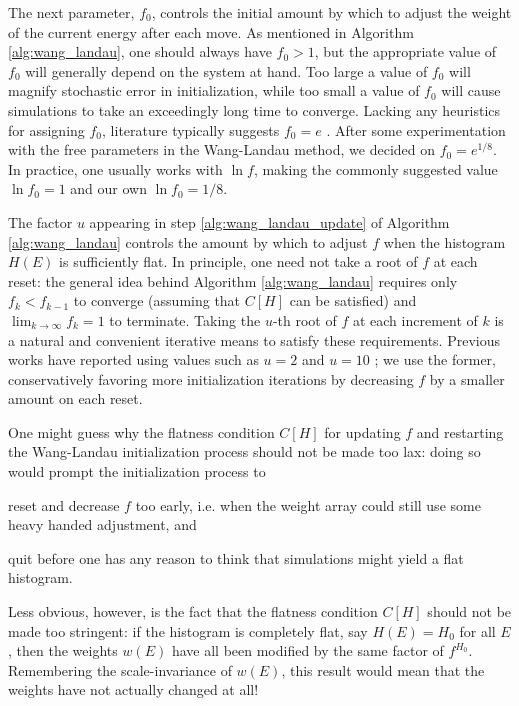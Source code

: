 \documentclass[11pt]{article}
\newcommand{\p}[1]{\left(#1\right)} %
\renewcommand{\sp}[1]{\left[#1\right]} %
\begin{document}
The next parameter, $f_0$, controls the initial amount by which to
adjust the weight of the current energy after each move. As mentioned
in Algorithm \ref{alg:wang_landau}, one should always have $f_0>1$,
but the appropriate value of $f_0$ will generally depend on the system
at hand. Too large a value of $f_0$ will magnify stochastic error in
initialization, while too small a value of $f_0$ will cause
simulations to take an exceedingly long time to converge. Lacking any
heuristics for assigning $f_0$, literature typically suggests $f_0=e$
\cite{wang_landau}. After some experimentation with the free
parameters in the Wang-Landau method, we decided on $f_0=e^{1/8}$. In
practice, one usually works with $\ln f$, making the commonly
suggested value $\ln f_0=1$ and our own $\ln f_0=1/8$.

The factor $u$ appearing in step \ref{alg:wang_landau_update} of
Algorithm \ref{alg:wang_landau} controls the amount by which to adjust
$f$ when the histogram $H\p{E}$ is sufficiently flat. In principle,
one need not take a root of $f$ at each reset: the general idea behind
Algorithm \ref{alg:wang_landau} requires only $f_k<f_{k-1}$ to
converge (assuming that $C\sp{H}$ can be satisfied) and
$\lim_{k\to\infty}f_k=1$ to terminate. Taking the $u$-th root of $f$
at each increment of $k$ is a natural and convenient iterative means
to satisfy these requirements. Previous works have reported using
values such as $u=2$ \cite{wang_landau, wang_landau_mod} and $u=10$
\cite{wang_landau_analysis}; we use the former, conservatively
favoring more initialization iterations by decreasing $f$ by a smaller
amount on each reset.

One might guess why the flatness condition $C\sp{H}$ for updating $f$
and restarting the Wang-Landau initialization process should not be
made too lax: doing so would prompt the initialization process to
\begin{enumerate*}[label=\roman*)]
\item reset and decrease $f$ too early, i.e. when the weight array
  could still use some heavy handed adjustment, and
\item quit before one has any reason to think that simulations might
  yield a flat histogram.
\end{enumerate*}
Less obvious, however, is the fact that the flatness condition
$C\sp{H}$ should not be made too stringent: if the histogram is
completely flat, say $H\p{E}=H_0$ for all $E$, then the weights
$w\p{E}$ have all been modified by the same factor of $f^{H_0}$.
Remembering the scale-invariance of $w\p{E}$, this result would mean
that the weights have not actually changed at all!
\end{document}
